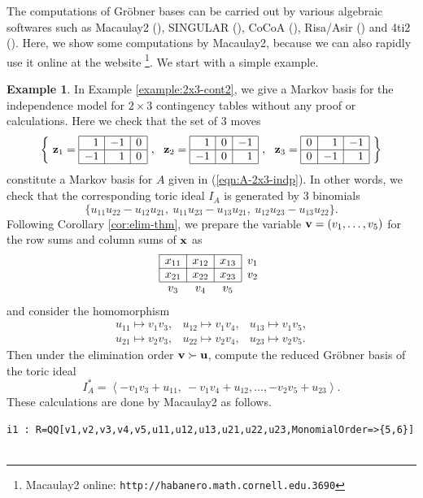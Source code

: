 \documentclass[12pt]{article}
\theoremstyle{definition}
\newtheorem{Example}[Theorem]{Example}
\def\Bx{{\bf x}}
\def\Bu{{\bf u}}
\def\Bv{{\bf v}}
\def\Bz{{\bf z}}
\begin{document}
The computations of Gr\"obner bases can be carried out by various
algebraic softwares such as Macaulay2 (\cite{Macaulay2}), SINGULAR
(\cite{Singular}),
CoCoA (\cite{CoCoA}), Risa/Asir (\cite{Risa/Asir}) and 4ti2
(\cite{4ti2}). Here, we show some computations by Macaulay2, because we
can also rapidly use it online at the website
\footnote{Macaulay2 online: {\tt http://habanero.math.cornell.edu.3690}}. 
We start with a simple example.
\begin{Example}
\label{example-2x3-cont4}
In Example \ref{example:2x3-cont2}, we give a Markov basis for the
 independence model for $2\times 3$ contingency tables without any proof or
 calculations. Here we check that the set of $3$ moves
\[
\left\{\ 
\Bz_1 = \begin{array}{|r|r|r|}\hline
1 & -1 & 0\\ \hline
-1 & 1 & 0\\ \hline
\end{array}\ ,\ \  
\Bz_2 = \begin{array}{|r|r|r|}\hline
1 & 0 & -1\\ \hline
-1 & 0 & 1\\ \hline
\end{array}\ ,\ \  
\Bz_3 = \begin{array}{|r|r|r|}\hline
0 & 1 & -1 \\ \hline
0 & -1 & 1 \\ \hline
\end{array}\ 
\right\}
\]
constitute a Markov basis for $A$ given in (\ref{eqn:A-2x3-indp}).
In other words, we check that 
 the corresponding toric ideal $I_A$ is generated by $3$ binomials
\begin{equation}
 \{u_{11}u_{22} - u_{12}u_{21},\ u_{11}u_{23}-u_{13}u_{21},\
 u_{12}u_{23}-u_{13}u_{22}\}. 
\label{eqn:2x3-MB}
\end{equation}
Following Corollary \ref{cor:elim-thm}, we
prepare the variable $\Bv = (v_1,\ldots,v_5)$ for the row sums and
 column sums of $\Bx$ as
\[
\begin{array}{|r|r|r|r}\cline{1-3}
x_{11} & x_{12} & x_{13} & v_1\\ \cline{1-3}
x_{21} & x_{22} & x_{23} & v_2\\ \cline{1-3}
\multicolumn{1}{c}{v_3} & \multicolumn{1}{c}{v_4} &
\multicolumn{1}{c}{v_5} & 
\end{array}
\]
and consider the homomorphism
\[
 \begin{array}{lll}
u_{11} \mapsto v_1v_3, & u_{12} \mapsto v_1v_4, & 
u_{13} \mapsto v_1v_5,\\
u_{21} \mapsto v_2v_3, & u_{22} \mapsto v_2v_4, & 
u_{23} \mapsto v_2v_5.
 \end{array}
\]
Then under the elimination order $\Bv \succ \Bu$, compute the reduced
 Gr\"obner basis of the toric ideal
\[
 I_{A}^* = \left< -v_1v_3 + u_{11},\ -v_1v_4 + u_{12}, \ldots, -v_2v_5 + u_{23}
\right>.
\]
These calculations are done by Macaulay2 as follows.
{\footnotesize
\begin{verbatim}
i1 : R=QQ[v1,v2,v3,v4,v5,u11,u12,u13,u21,u22,u23,MonomialOrder=>{5,6}]


\end{verbatim}}
\end{Example}
\end{document}
